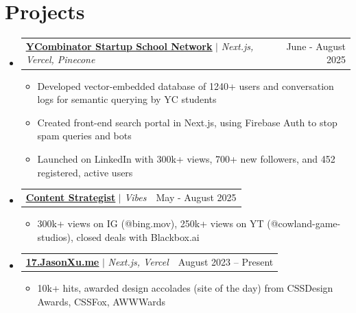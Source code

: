 \documentclass[letterpaper,11pt]{article}
\makeatletter
\newcommand{\resumeItem}[1]{
  \item\small{
    {#1 \vspace{-2pt}}
  }
}
\newcommand{\resumeProjectHeading}[2]{
    \item
    \begin{tabular*}{0.97\textwidth}{l@{\extracolsep{\fill}}r}
      \small#1 & #2 \\
    \end{tabular*}\vspace{-7pt}
}
\newcommand{\resumeSubHeadingListStart}{\begin{itemize}[leftmargin=0.15in, label={}]}
\newcommand{\resumeSubHeadingListEnd}{\end{itemize}}
\newcommand{\resumeItemListStart}{\begin{itemize}}
\newcommand{\resumeItemListEnd}{\end{itemize}\vspace{-5pt}}
\makeatother
\begin{document}
\section{Projects}
    \resumeSubHeadingListStart

      \resumeProjectHeading
          {\href{https://yc-ai-sus-search-engine.vercel.app/}{\underline{\textbf{YCombinator Startup School Network}}} $|$ \emph{Next.js, Vercel, Pinecone}}{June - August 2025}
          \resumeItemListStart
            \resumeItem{Developed vector-embedded database of 1240+ users and conversation logs for semantic querying by YC students}
            \resumeItem{Created front-end search portal in Next.js, using Firebase Auth to stop spam queries and bots}
            \resumeItem{Launched on LinkedIn with 300k+ views, 700+ new followers, and 452 registered, active users}
          \resumeItemListEnd

       \resumeProjectHeading
          {\href{https://insta.jasonxu.me}{\underline{\textbf{Content Strategist}}} $|$ \emph{Vibes}}{May - August 2025}
          \resumeItemListStart
            \resumeItem{300k+ views on IG (@bing.mov), 250k+ views on YT (@cowland-game-studios), closed deals with Blackbox.ai}
          \resumeItemListEnd

    \resumeProjectHeading
          {\href{https://17.jasonxu.me}{\underline{\textbf{17.JasonXu.me}}} $|$ \emph{Next.js, Vercel}}{August 2023 -- Present}
          \resumeItemListStart
            \resumeItem{10k+ hits, awarded design accolades (site of the day) from CSSDesign Awards, CSSFox, AWWWards}
          \resumeItemListEnd

    \resumeSubHeadingListEnd


\end{document}

